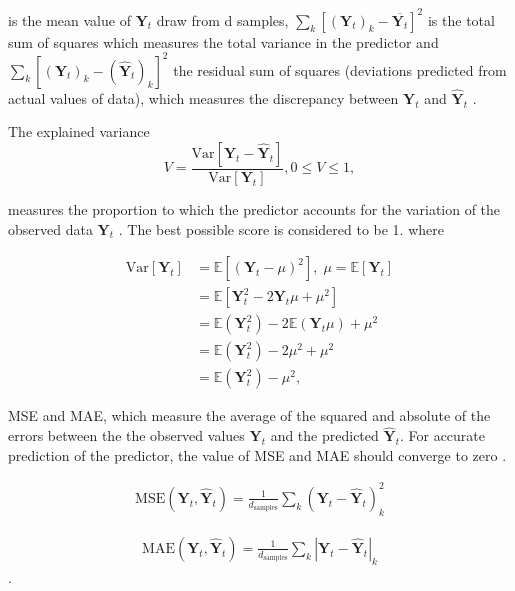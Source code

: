 is the mean value of $\textbf{Y}_{t}$ draw from d samples,  
 $\sum_{k}\left[(\textbf{Y}_{t})_{k}-\overline{\textbf{Y}_{t}}\right]^2$ is the total sum of squares which measures the total variance in the predictor and $\sum_{k} \left[(\textbf{Y}_{t})_{k}-(\widehat{\textbf{Y}}_{t})_{k}\right]^2$ the residual sum of squares (deviations predicted from actual values of data), which measures the discrepancy between $\textbf{Y}_{t}$ and $\widehat{\textbf{Y}}_{t}$ \citep{james2013introduction}.

The explained variance
\begin{equation}
V=\frac{\text{Var}\left[\textbf{Y}_{t}-\widehat{\textbf{Y}}_{t} \right]}{\text{Var}\left[\textbf{Y}_{t}\right]}, 0 \leq V \leq 1, 
\label{ExV}
\end{equation}  

measures the proportion to which the predictor accounts for the variation of the observed data $\textbf{Y}_{t}$ \citep{bellinger2016fundamental}. The best possible score is considered to be 1. where 

\begin{align*}
\text{Var}\left[\textbf{Y}_{t}\right]&=\mathbb{E}\left[(\textbf{Y}_{t}-\mu)^2\right],\; \mu=\mathbb{E}\left[\textbf{Y}_{t}\right]\\
&=\mathbb{E}\left[\textbf{Y}_{t}^2-2\textbf{Y}_{t} \mu +\mu^2\right]\\
&=\mathbb{E}(\textbf{Y}_{t}^2)- 2\mathbb{E}(\textbf{Y}_{t} \mu) + \mu^2\\
&=\mathbb{E}(\textbf{Y}_{t}^2)-2 \mu^2 + \mu^2\\
&=\mathbb{E}(\textbf{Y}_{t}^2)-\mu^2,
\end{align*}
\citep{fortmann2012understanding}

MSE and MAE, which measure the average of the squared and absolute of the errors between the the observed values $\textbf{Y}_{t}$ and the predicted $\widehat{\textbf{Y}}_{t}$. For accurate prediction of the predictor, the value of MSE and MAE should converge to zero \citep{james2013introduction}. 

\begin{align}
\text{MSE}\left(\textbf{Y}_{t},\widehat{\textbf{Y}}_{t} \right)=\frac{1}{d_\mathrm{samples}} \sum_{k} (\textbf{Y}_{t}-\widehat{\textbf{Y}}_{t})^2_{k}
\label{MSE}
\end{align}

\begin{align}
\text{MAE}\left(\textbf{Y}_{t},\widehat{\textbf{Y}}_{t} \right)=\frac{1}{d_\mathrm{samples}} \sum_{k} \left|\textbf{Y}_{t}-\widehat{\textbf{Y}}_{t}\right|_{k}
\label{MAE}
\end{align}.

